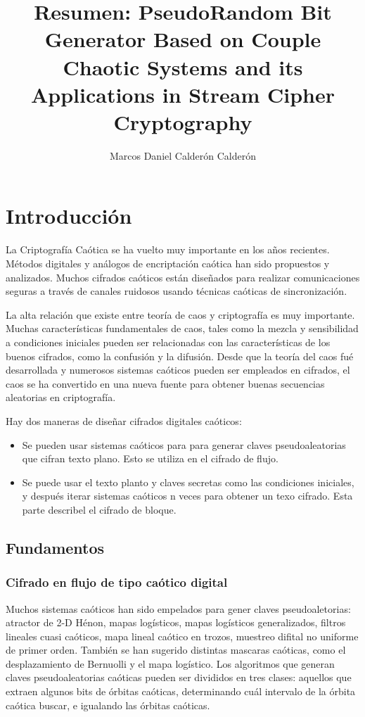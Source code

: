 \documentclass[prodmode,acmtap]{acmlarge}
\title{Resumen:  PseudoRandom Bit Generator Based on Couple Chaotic Systems and its Applications in Stream Cipher Cryptography}
\author{Marcos Daniel Calderón Calderón \affil{CIMAT}
}
\begin{document}
\maketitle

\section{Introducción}
La Criptografía Caótica se ha vuelto muy importante en los años recientes. Métodos digitales y análogos de encriptación caótica han sido propuestos y analizados. Muchos cifrados caóticos están diseñados para realizar comunicaciones seguras a través de canales ruidosos usando técnicas caóticas de sincronización. 

La alta relación que existe entre teoría de caos y criptografía es muy importante. Muchas características fundamentales de caos, tales como la mezcla y sensibilidad a condiciones iniciales pueden ser relacionadas con las características de los buenos cifrados, como la confusión y la difusión. Desde que la teoría del caos fué desarrollada y numerosos sistemas caóticos  pueden ser empleados en cifrados, el caos se ha convertido en una nueva fuente para obtener buenas secuencias aleatorias en criptografía.

Hay dos maneras de diseñar cifrados digitales caóticos:
\begin{itemize}
\item Se pueden usar sistemas caóticos para para generar claves pseudoaleatorias que cifran texto plano. Esto se utiliza en el cifrado de flujo. 
\item Se puede usar el texto planto  y claves secretas como las condiciones iniciales, y después iterar sistemas caóticos n veces para obtener un texo cifrado. Esta parte describel el cifrado de bloque.
\end{itemize}


\subsection{Fundamentos}
\subsubsection{Cifrado en flujo de tipo caótico digital}
Muchos sistemas caóticos han sido empelados para gener  claves pseudoaletorias:  atractor de 2-D Hénon, mapas logísticos, mapas logísticos generalizados,  filtros lineales cuasi caóticos, mapa lineal caótico en trozos,  muestreo difital  no uniforme de primer orden. También se han sugerido distintas mascaras caóticas, como el desplazamiento de Bernuolli y el mapa logístico. Los algoritmos que generan claves pseudoaleatorias caóticas  pueden ser divididos en tres clases: aquellos que extraen algunos bits de órbitas caóticas, determinando cuál intervalo de la órbita caótica buscar, e igualando las órbitas caóticas. 
\end{document}
